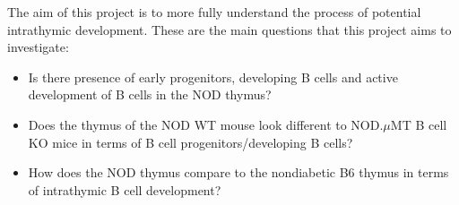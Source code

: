 The aim of this project is to more fully understand the process of potential intrathymic development.
These are the main questions that this project aims to investigate:
\begin{itemize}
\item Is there presence of early progenitors, developing B cells and active development of B cells in the NOD thymus?
\item Does the thymus of the NOD WT mouse look different to NOD.$\mu$MT B cell KO mice in terms of B cell progenitors/developing B cells?
\item How does the NOD thymus compare to the nondiabetic B6 thymus in terms of intrathymic B cell development?
\end{itemize}





































